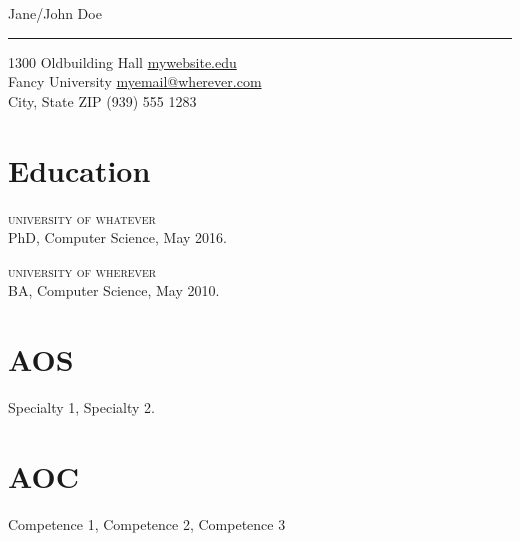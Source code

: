 \documentclass[11pt]{article}
\begin{document}
\begin{center}
{\LARGE Jane/John Doe}
\end{center}

\hrule

\vspace{.1in}

1300 Oldbuilding Hall \hfill \href{https://www.mywebsite.edu}{mywebsite.edu} \\
Fancy University   \hfill \href{mailto:myemail@wherever.com}{myemail@wherever.com}\\
City, State ZIP \hfill (939) 555 1283

\vspace{2pc}

\section*{Education}

\begin{description}[
  itemsep=-.3em,
  leftmargin=\dimexpr\leftmargini+1em\relax,
  labelindent=-1em,
  listparindent=-1em,
  itemindent=-1em
]
\item \textsc{university of whatever}\\
PhD, Computer Science, May 2016.
\item \textsc{university of wherever}\\
BA, Computer Science, May 2010.
\end{description}

\section*{AOS}
\begin{description}[
  itemsep=0pc,
  leftmargin=\dimexpr\leftmargini+1em\relax,
  labelindent=-1em,
  listparindent=-1em,
  itemindent=-1em
]
\item Specialty 1, Specialty 2.
\end{description}

\section*{AOC}
\begin{description}[
  itemsep=-.4em,
  leftmargin=\dimexpr\leftmargini+1em\relax,
  labelindent=-1em,
  listparindent=-1em,
  itemindent=-1em
]
\item Competence 1, Competence 2, Competence 3
\end{description}
\end{document}
